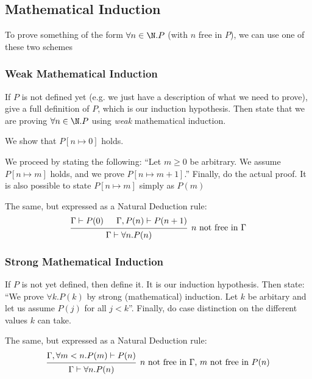 \subsection{Mathematical Induction}
To prove something of the form $\forall n \in \N. P$ (with $n$ free in $P$), we can use one of these two schemes

\subsubsection{Weak Mathematical Induction}
If $P$ is not defined yet (e.g. we just have a description of what we need to prove), give a full definition of $P$, which is our induction hypothesis.
Then state that we are proving $\forall n \in \N. P$ using \textit{weak} mathematical induction.

 We show that $P[n \mapsto 0]$ holds.

 We proceed by stating the following:
``Let $m \geq 0$ be arbitrary. We assume $P[n \mapsto m]$ holds, and we prove $P[n \mapsto m + 1]$.''
Finally, do the actual proof. It is also possible to state $P[n \mapsto m]$ simply as $P(m)$

The same, but expressed as a Natural Deduction rule:
\[
    \begin{prooftree}
        \hypo{\Gamma \vdash P(0)}
        \hypo{\Gamma, P(n) \vdash P(n + 1)}
        \infer2[$n$ not free in $\Gamma$]{\Gamma \vdash \forall n. P(n)}
    \end{prooftree}
\]

\subsubsection{Strong Mathematical Induction}
If $P$ is not yet defined, then define it. It is our induction hypothesis.
Then state: ``We prove $\forall k. P(k)$ by strong (mathematical) induction.
Let $k$ be arbitary and let us assume $P(j)$ for all $j < k$''. Finally, do case distinction on the different values $k$ can take.

The same, but expressed as a Natural Deduction rule:
\[
    \begin{prooftree}
        \hypo{\Gamma, \forall m < n. P(m) \vdash P(n)}
        \infer1[$n$ not free in $\Gamma$, $m$ not free in $P(n)$]{\Gamma \vdash \forall n . P(n)}
    \end{prooftree}
\]

